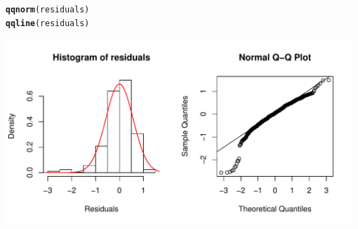 \documentclass{report}\usepackage[]{graphicx}\usepackage[]{color}
\makeatletter
\def\maxwidth{ %
  \ifdim\Gin@nat@width>\linewidth
    \linewidth
  \else
    \Gin@nat@width
  \fi
}
\newcommand{\hlstd}[1]{\textcolor[rgb]{0.345,0.345,0.345}{#1}}%
\newcommand{\hlkwd}[1]{\textcolor[rgb]{0.737,0.353,0.396}{\textbf{#1}}}%
\newenvironment{kframe}{%
 \def\at@end@of@kframe{}%
 \ifinner\ifhmode%
  \def\at@end@of@kframe{\end{minipage}}%
  \begin{minipage}{\columnwidth}%
 \fi\fi%
 \def\FrameCommand##1{\hskip\@totalleftmargin \hskip-\fboxsep
 \colorbox{shadecolor}{##1}\hskip-\fboxsep
     \hskip-\linewidth \hskip-\@totalleftmargin \hskip\columnwidth}%
 \MakeFramed {\advance\hsize-\width
   \@totalleftmargin\z@ \linewidth\hsize
   \@setminipage}}%
 {\par\unskip\endMakeFramed%
 \at@end@of@kframe}
\newenvironment{knitrout}{}{} %
\makeatother
\begin{document}
\begin{knitrout}
\begin{kframe}
\begin{alltt}
\hlkwd{qqnorm}\hlstd{(residuals)}
\hlkwd{qqline}\hlstd{(residuals)}
\end{alltt}
\end{kframe}

{\centering \includegraphics[width=\maxwidth]{figure/unnamed-chunk-121-1} 

}



\end{knitrout}


\end{document}

